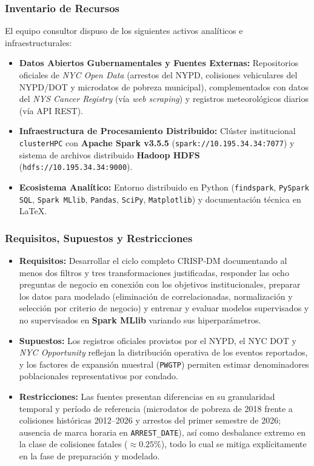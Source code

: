 \documentclass[11pt,a4paper]{article}
\begin{document}
\subsubsection{Inventario de Recursos}
El equipo consultor dispuso de los siguientes activos analíticos e infraestructurales:
\begin{itemize}
    \item \textbf{Datos Abiertos Gubernamentales y Fuentes Externas:} Repositorios oficiales de \textit{NYC Open Data} (arrestos del NYPD, colisiones vehiculares del NYPD/DOT y microdatos de pobreza municipal), complementados con datos del \textit{NYS Cancer Registry} (vía \textit{web scraping}) y registros meteorológicos diarios (vía API REST).
    \item \textbf{Infraestructura de Procesamiento Distribuido:} Clúster institucional \texttt{clusterHPC} con \textbf{Apache Spark v3.5.5} (\texttt{spark://10.195.34.34:7077}) y sistema de archivos distribuido \textbf{Hadoop HDFS} (\texttt{hdfs://10.195.34.34:9000}).
    \item \textbf{Ecosistema Analítico:} Entorno distribuido en Python (\texttt{findspark}, \texttt{PySpark SQL}, \texttt{Spark MLlib}, \texttt{Pandas}, \texttt{SciPy}, \texttt{Matplotlib}) y documentación técnica en \LaTeX{}.
\end{itemize}

\subsubsection{Requisitos, Supuestos y Restricciones}
\begin{itemize}
    \item \textbf{Requisitos:} Desarrollar el ciclo completo CRISP-DM documentando al menos dos filtros y tres transformaciones justificadas, responder las ocho preguntas de negocio en conexión con los objetivos institucionales, preparar los datos para modelado (eliminación de correlacionadas, normalización y selección por criterio de negocio) y entrenar y evaluar modelos supervisados y no supervisados en \textbf{Spark MLlib} variando sus hiperparámetros.
    \item \textbf{Supuestos:} Los registros oficiales provistos por el NYPD, el NYC DOT y \textit{NYC Opportunity} reflejan la distribución operativa de los eventos reportados, y los factores de expansión muestral (\texttt{PWGTP}) permiten estimar denominadores poblacionales representativos por condado.
    \item \textbf{Restricciones:} Las fuentes presentan diferencias en su granularidad temporal y período de referencia (microdatos de pobreza de 2018 frente a colisiones históricas 2012--2026 y arrestos del primer semestre de 2026; ausencia de marca horaria en \texttt{ARREST\_DATE}), así como desbalance extremo en la clase de colisiones fatales ($\approx 0.25\%$), todo lo cual se mitiga explícitamente en la fase de preparación y modelado.
\end{itemize}
\end{document}
